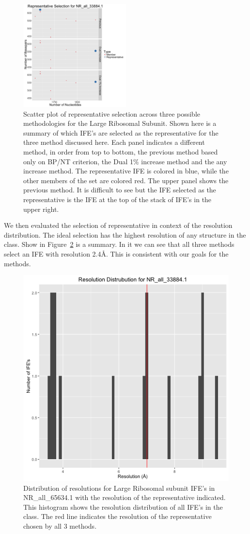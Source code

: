 \begin{figure}
  \includegraphics[width=0.5\textwidth]{chapter-4/figs/hm-lsu-rep}
  \caption{Scatter plot of representative selection across three possible
    methodologies for the \HM{} Large Ribosomal Subunit. Shown here is a summary
    of which IFE’s are selected as the representative for the three method discussed
    here. Each panel indicates a different method, in order from top to bottom,
    the previous method based only on BP/NT criterion, the Dual 1\% increase
    method and the any increase method. The representative IFE is colored in
    blue, while the other members of the set are colored red. The upper panel
    shows the previous method. It is difficult to see but the IFE selected as
    the representative is the IFE at the top of the stack of IFE’s in the upper
    right.}
\label{fig:hm-lsu-rep}
\end{figure}

We then evaluated the selection of representative in context of the resolution
distribution. The ideal selection has the highest resolution of any structure in
the class. Show in Figure~\ref{fig:hm-rep-res-dist} is a summary. In it we can
see that all three methods select an IFE with resolution 2.4{\AA}. This is
consistent with our goals for the methods.

\begin{figure}
  \includegraphics[width=0.5\linewidth]{chapter-4/figs/hm-lsu-res}
  \caption{Distribution of resolutions for \HM{} Large Ribosomal subunit IFE’s
    in NR\_all\_65634.1 with the resolution of the representative indicated.
    This histogram shows the resolution distribution of all IFE’s in the
    class. The red line indicates the resolution of the representative chosen by
  all 3 methods.}
\label{fig:hm-rep-res-dist}
\end{figure}

